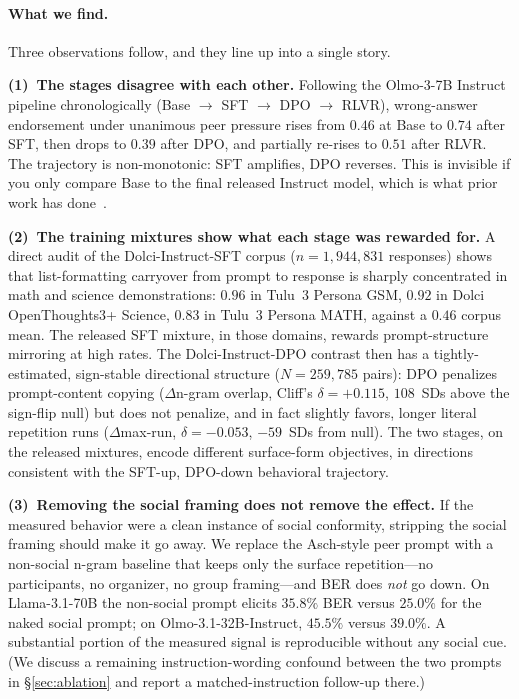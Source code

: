 \documentclass{article}
\begin{document}
\paragraph{What we find.}
Three observations follow, and they line up into a single story.

\textbf{(1)~The stages disagree with each other.} Following the Olmo-3-7B Instruct pipeline chronologically (Base $\to$ SFT $\to$ DPO $\to$ RLVR), wrong-answer endorsement under unanimous peer pressure rises from $0.46$ at Base to $0.74$ after SFT, then drops to $0.39$ after DPO, and partially re-rises to $0.51$ after RLVR. The trajectory is non-monotonic: SFT amplifies, DPO reverses. This is invisible if you only compare Base to the final released Instruct model, which is what prior work has done~\citep{zhu2025conformity}.

\textbf{(2)~The training mixtures show what each stage was rewarded for.} A direct audit of the Dolci-Instruct-SFT corpus ($n{=}1{,}944{,}831$ responses) shows that list-formatting carryover from prompt to response is sharply concentrated in math and science demonstrations: $0.96$ in Tulu~3 Persona GSM, $0.92$ in Dolci OpenThoughts3+ Science, $0.83$ in Tulu~3 Persona MATH, against a $0.46$ corpus mean. The released SFT mixture, in those domains, rewards prompt-structure mirroring at high rates. The Dolci-Instruct-DPO contrast then has a tightly-estimated, sign-stable directional structure ($N{=}259{,}785$ pairs): DPO penalizes prompt-content copying ($\Delta$n-gram overlap, Cliff's $\delta{=}{+}0.115$, $108$~SDs above the sign-flip null) but does not penalize, and in fact slightly favors, longer literal repetition runs ($\Delta$max-run, $\delta{=}{-}0.053$, $-59$~SDs from null). The two stages, on the released mixtures, encode different surface-form objectives, in directions consistent with the SFT-up, DPO-down behavioral trajectory.

\textbf{(3)~Removing the social framing does not remove the effect.} If the measured behavior were a clean instance of social conformity, stripping the social framing should make it go away. We replace the Asch-style peer prompt with a non-social n-gram baseline that keeps only the surface repetition---no participants, no organizer, no group framing---and BER does \emph{not} go down. On Llama-3.1-70B the non-social prompt elicits $35.8\%$ BER versus $25.0\%$ for the naked social prompt; on Olmo-3.1-32B-Instruct, $45.5\%$ versus $39.0\%$. A substantial portion of the measured signal is reproducible without any social cue. (We discuss a remaining instruction-wording confound between the two prompts in \S\ref{sec:ablation} and report a matched-instruction follow-up there.)
\end{document}
